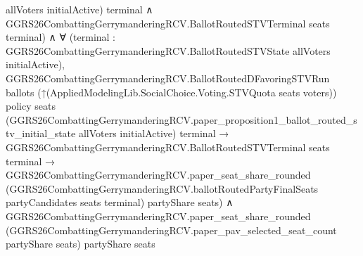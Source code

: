 \documentclass[10pt]{article}
\begin{document}
\begin{ReviewVerbatim}
                                                  allVoters initialActive)
                                                terminal ∧
                                              GGRS26CombattingGerrymanderingRCV.BallotRoutedSTVTerminal seats
                                                terminal) ∧
                                          ∀
                                            (terminal :
                                              GGRS26CombattingGerrymanderingRCV.BallotRoutedSTVState allVoters
                                                initialActive),
                                            GGRS26CombattingGerrymanderingRCV.BallotRoutedDFavoringSTVRun ballots
                                                (↑(AppliedModelingLib.SocialChoice.Voting.STVQuota seats voters)) policy
                                                seats
                                                (GGRS26CombattingGerrymanderingRCV.paper_proposition1_ballot_routed_stv_initial_state
                                                  allVoters initialActive)
                                                terminal →
                                              GGRS26CombattingGerrymanderingRCV.BallotRoutedSTVTerminal seats terminal →
                                                GGRS26CombattingGerrymanderingRCV.paper_seat_share_rounded
                                                  (GGRS26CombattingGerrymanderingRCV.ballotRoutedPartyFinalSeats
                                                    partyCandidates seats terminal)
                                                  partyShare seats) ∧
                                      GGRS26CombattingGerrymanderingRCV.paper_seat_share_rounded
                                        (GGRS26CombattingGerrymanderingRCV.paper_pav_selected_seat_count partyShare
                                          seats)
                                        partyShare seats
\end{ReviewVerbatim}
\end{document}
